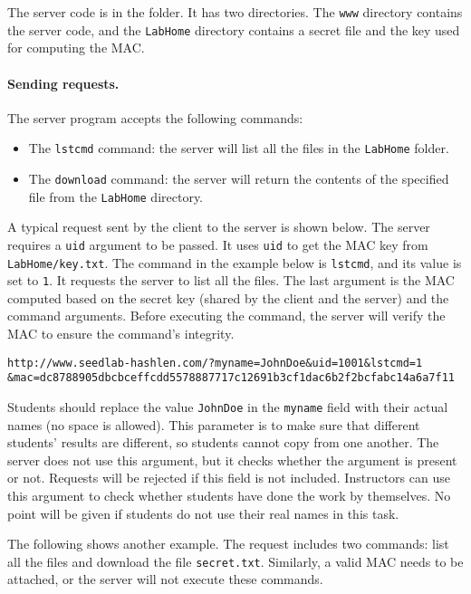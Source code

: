 The server code is in the  folder.
It has two directories. 
The \texttt{www} directory contains the server code, and the 
\texttt{LabHome} directory contains a secret file and 
the key used for computing the MAC. 




\paragraph{Sending requests.} The server program accepts the following commands:

\begin{itemize}
\item The \texttt{lstcmd} command: the server will list all the files in the
\texttt{LabHome} folder.
\item The \texttt{download} command: the server will return the contents of the 
specified file from the \texttt{LabHome} directory.
\end{itemize}

A typical request sent by the client to the server is shown below. 
The server requires a \texttt{uid} argument to be passed. It uses 
\texttt{uid} to get the MAC key from 
\texttt{LabHome/key.txt}. The command 
in the example below is \texttt{lstcmd}, and its value is set to \texttt{1}. It requests
the server to list all the files. The last argument is the MAC computed based on the 
secret key (shared by the client and the server) and the command arguments.
Before executing the command, the server will verify the MAC to ensure
the command's integrity. 

\begin{lstlisting}
http://www.seedlab-hashlen.com/?myname=JohnDoe&uid=1001&lstcmd=1
&mac=dc8788905dbcbceffcdd5578887717c12691b3cf1dac6b2f2bcfabc14a6a7f11
\end{lstlisting}


Students should replace the value \texttt{JohnDoe} in the 
\texttt{myname} field with their actual names (no space 
is allowed). This parameter is to make sure that different students'
results are different, so students cannot copy from one
another. The server does not use this argument, but it checks 
whether the argument is present or not. Requests will be rejected
if this field is not included. 
Instructors
can use this argument to check whether students have done the work by
themselves. No point will be given if students do not use
their real names in this task.


The following shows another example. The request includes 
two commands: list all the files and download the 
file \texttt{secret.txt}. Similarly, a valid MAC needs to be attached, 
or the server will not execute these commands.  

